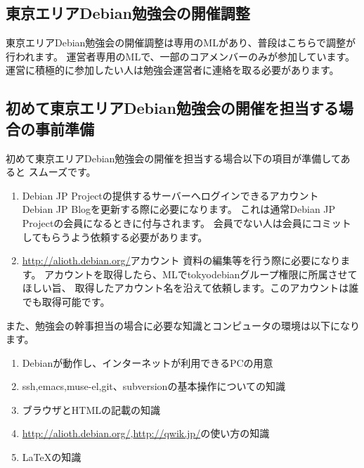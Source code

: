 \documentclass[mingoth,a4paper]{jsarticle}
\begin{document}
\subsection{東京エリアDebian勉強会の開催調整}

東京エリアDebian勉強会の開催調整は専用のMLがあり、普段はこちらで調整が行われます。
運営者専用のMLで、一部のコアメンバーのみが参加しています。
運営に積極的に参加したい人は勉強会運営者に連絡を取る必要があります。

\subsection{初めて東京エリアDebian勉強会の開催を担当する場合の事前準備}

初めて東京エリアDebian勉強会の開催を担当する場合以下の項目が準備してあると
スムーズです。

\begin{enumerate}
\item Debian JP Projectの提供するサーバーへログインできるアカウント\\
Debian JP Blogを更新する際に必要になります。
これは通常Debian JP Projectの会員になるときに付与されます。
会員でない人は会員にコミットしてもらうよう依頼する必要があります。

\item \url{http://alioth.debian.org/}アカウント
資料の編集等を行う際に必要になります。
アカウントを取得したら、MLでtokyodebianグループ権限に所属させてほしい旨、
取得したアカウント名を沿えて依頼します。このアカウントは誰でも取得可能です。


\end{enumerate}

また、勉強会の幹事担当の場合に必要な知識とコンピュータの環境は以下になります。

\begin{enumerate}
\item Debianが動作し、インターネットが利用できるPCの用意
\item ssh,emacs,muse-el,git、subversionの基本操作についての知識
\item ブラウザとHTMLの記載の知識
\item \url{http://alioth.debian.org/},\url{http://qwik.jp/}の使い方の知識
\item \LaTeX{}の知識
\end{enumerate}
\end{document}

